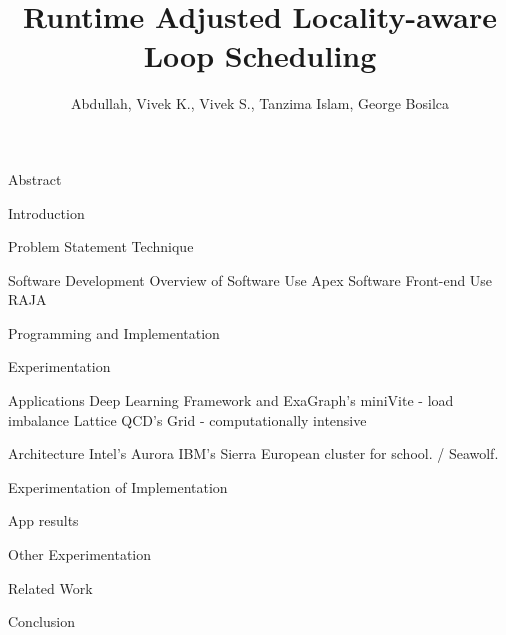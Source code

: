 \documentclass[12pt]{article}
\title{Runtime Adjusted Locality-aware Loop Scheduling}
\author{Abdullah, Vivek K., Vivek S., Tanzima Islam, George Bosilca}
\begin{document}
 

\begin{outline}[enumerate] 

\1 Abstract 
 
    
\1 Introduction 

\1 Problem Statement 
   \2 
   \2 
   \2  
\1 Technique 
   \2 
   \2 
   \2 
   \2 
   
\1 Software Development 
  \2 Overview of Software
    \3 Use Apex 
    \3 
  \2 Software Front-end 
    \3 Use RAJA  
  
  \2 Programming and Implementation 


\1 Experimentation 

    \2 Applications 
       \3 Deep Learning Framework and ExaGraph's miniVite - load imbalance 
       \3 Lattice QCD's Grid - computationally intensive 
       
    \2 Architecture 
        \3 Intel's Aurora
        \3 IBM's Sierra 
        \3 European cluster for school. / Seawolf. 
        
    \2 Experimentation of Implementation 
       
    \2 App results 
    
    \2 Other Experimentation 
       
\1 Related Work
    \2 
    \2
    \2 

\1 Conclusion 

    \2 
    \2
    \2 

\end{outline}
\end{document}
